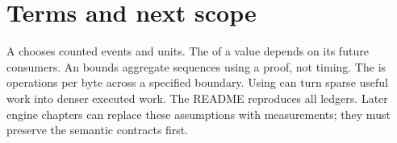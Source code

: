 \section{Terms and next scope}
A  chooses counted events and units.
The  of a value depends on its future consumers.
An  bounds aggregate sequences using a proof, not timing.
The  is operations per byte across a specified boundary.
Using  can turn sparse useful work into denser executed work.
The README reproduces all ledgers. Later engine chapters can replace these
assumptions with measurements; they must preserve the semantic contracts first.

